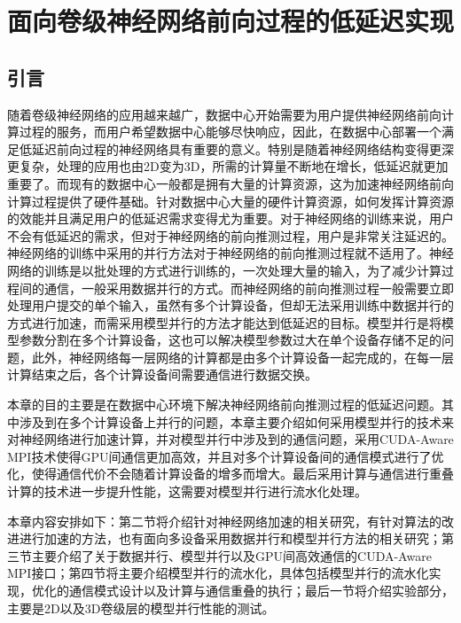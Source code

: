 \chapter{面向卷级神经网络前向过程的低延迟实现}
\section{引言}
随着卷级神经网络的应用越来越广，数据中心开始需要为用户提供神经网络前向计算过程的服务，而用户希望数据中心能够尽快响应，因此，在数据中心部署一个满足低延迟前向过程的神经网络具有重要的意义。特别是随着神经网络结构变得更深更复杂，处理的应用也由2D变为3D，所需的计算量不断地在增长，低延迟就更加重要了。而现有的数据中心一般都是拥有大量的计算资源，这为加速神经网络前向计算过程提供了硬件基础。针对数据中心大量的硬件计算资源，如何发挥计算资源的效能并且满足用户的低延迟需求变得尤为重要。对于神经网络的训练来说，用户不会有低延迟的需求，但对于神经网络的前向推测过程，用户是非常关注延迟的。神经网络的训练中采用的并行方法对于神经网络的前向推测过程就不适用了。神经网络的训练是以批处理的方式进行训练的，一次处理大量的输入，为了减少计算过程间的通信，一般采用数据并行的方式。而神经网络的前向推测过程一般需要立即处理用户提交的单个输入，虽然有多个计算设备，但却无法采用训练中数据并行的方式进行加速，而需采用模型并行的方法才能达到低延迟的目标。模型并行是将模型参数分割在多个计算设备，这也可以解决模型参数过大在单个设备存储不足的问题，此外，神经网络每一层网络的计算都是由多个计算设备一起完成的，在每一层计算结束之后，各个计算设备间需要通信进行数据交换。

本章的目的主要是在数据中心环境下解决神经网络前向推测过程的低延迟问题。其中涉及到在多个计算设备上并行的问题，本章主要介绍如何采用模型并行的技术来对神经网络进行加速计算，并对模型并行中涉及到的通信问题，采用CUDA-Aware MPI技术使得GPU间通信更加高效，并且对多个计算设备间的通信模式进行了优化，使得通信代价不会随着计算设备的增多而增大。最后采用计算与通信进行重叠计算的技术进一步提升性能，这需要对模型并行进行流水化处理。

本章内容安排如下：第二节将介绍针对神经网络加速的相关研究，有针对算法的改进进行加速的方法，也有面向多设备采用数据并行和模型并行方法的相关研究；第三节主要介绍了关于数据并行、模型并行以及GPU间高效通信的CUDA-Aware MPI接口；第四节将主要介绍模型并行的流水化，具体包括模型并行的流水化实现，优化的通信模式设计以及计算与通信重叠的执行；最后一节将介绍实验部分，主要是2D以及3D卷级层的模型并行性能的测试。

